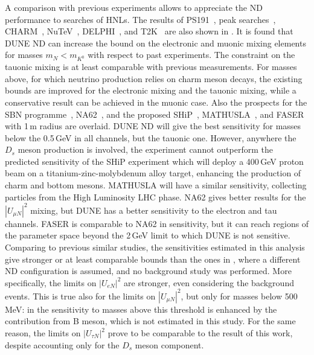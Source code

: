 A comparison with previous experiments allows to appreciate the ND performance to searches of HNLs.
The results of PS191~\cite{Bernardi:1985ny, Bernardi:1987ek}, peak searches~\cite{Artamonov:2014urb, Britton:1992pg, Britton:1992xv}, %
CHARM~\cite{Vilain:1994vg}, NuTeV~\cite{Vaitaitis:1999wq}, DELPHI~\cite{Abreu:1996pa}, and T2K~\cite{Abe:2019kgx} are also shown %
in .
It is found that DUNE ND can increase the bound on the electronic and muonic mixing elements %
for masses $m_N < m_{K^0}$ with respect to past experiments.
The constraint on the tauonic mixing is at least comparable with previous measurements.
For masses above, for which neutrino production relies on charm meson decays, the existing bounds %
are improved for the electronic mixing and the tauonic mixing, while a conservative result %
can be achieved in the muonic case.
Also the prospects for the SBN programme~\cite{Ballett:2016opr}, %
NA62~\cite{Drewes:2018irr}, and the proposed SHiP~\cite{Alekhin:2015byh}, MATHUSLA~\cite{Curtin:2018mvb}, %
and FASER~\cite{Kling:2018wct} with 1\,m radius are overlaid.
DUNE ND will give the best sensitivity for masses below the 0.5\,GeV in all channels, but the tauonic one.
However, anywhere the $D_s$ meson production is involved, the experiment cannot outperform the predicted %
sensitivity of the SHiP experiment which will deploy a 400\,GeV proton beam on a titanium-zinc-molybdenum alloy %
target, enhancing the production of charm and bottom mesons.
MATHUSLA will have a similar sensitivity, collecting particles from the High Luminosity LHC phase.
NA62 gives better results for the $|U_{\mu N}|^2$ mixing, but DUNE has a better sensitivity %
to the electron and tau channels.
FASER is comparable to NA62 in sensitivity, but it can reach regions of the parameter space beyond the 2\,GeV limit %
to which DUNE is not sensitive.
Comparing to previous similar studies, the sensitivities estimated in this analysis give stronger %
or at least comparable bounds than the ones in , 
where a different ND configuration is assumed, and no background study was performed.
More specifically, the limits on $|U_{eN}|^2$ are stronger, even considering the background events.
This is true also for the limits on $|U_{\mu N}|^2$, but only for masses below 500 MeV: %
in  the sensitivity to masses above this threshold is enhanced by the contribution %
from B meson, which is not estimated in this study.
For the same reason, the limits on $|U_{\tau N}|^2$ prove to be comparable to the result of this work, %
despite accounting only for the $D_s$ meson component.

